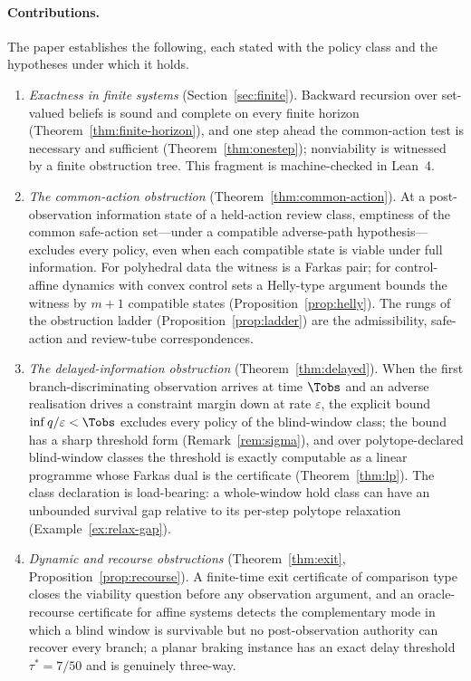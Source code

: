 \paragraph{Contributions.} The paper establishes the following, each stated with the policy class and the hypotheses under which it holds.
\begin{enumerate}[leftmargin=2em,itemsep=2pt]
\item \emph{Exactness in finite systems} (Section~\ref{sec:finite}). Backward recursion over set-valued beliefs is sound and complete on every finite horizon (Theorem~\ref{thm:finite-horizon}), and one step ahead the common-action test is necessary and sufficient (Theorem~\ref{thm:onestep}); nonviability is witnessed by a finite obstruction tree. This fragment is machine-checked in Lean~4.
\item \emph{The common-action obstruction} (Theorem~\ref{thm:common-action}). At a post-observation information state of a held-action review class, emptiness of the common safe-action set---under a compatible adverse-path hypothesis---excludes every policy, even when each compatible state is viable under full information. For polyhedral data the witness is a Farkas pair; for control-affine dynamics with convex control sets a Helly-type argument bounds the witness by $m+1$ compatible states (Proposition~\ref{prop:helly}). The rungs of the obstruction ladder (Proposition~\ref{prop:ladder}) are the admissibility, safe-action and review-tube correspondences.
\item \emph{The delayed-information obstruction} (Theorem~\ref{thm:delayed}). When the first branch-discriminating observation arrives at time $\Tobs$ and an adverse realisation drives a constraint margin down at rate $\varepsilon$, the explicit bound $\inf q/\varepsilon<\Tobs$ excludes every policy of the blind-window class; the bound has a sharp threshold form (Remark~\ref{rem:sigma}), and over polytope-declared blind-window classes the threshold is exactly computable as a linear programme whose Farkas dual is the certificate (Theorem~\ref{thm:lp}). The class declaration is load-bearing: a whole-window hold class can have an unbounded survival gap relative to its per-step polytope relaxation (Example~\ref{ex:relax-gap}).
\item \emph{Dynamic and recourse obstructions} (Theorem~\ref{thm:exit}, Proposition~\ref{prop:recourse}). A finite-time exit certificate of comparison type closes the viability question before any observation argument, and an oracle-recourse certificate for affine systems detects the complementary mode in which a blind window is survivable but no post-observation authority can recover every branch; a planar braking instance has an exact delay threshold $\tau^*=7/50$ and is genuinely three-way.

\end{enumerate}
